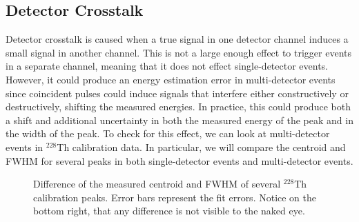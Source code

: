 \documentclass[notitlepage,rmp,aps,10pt]{revtex4-1}
\newcommand{\iso}[2]{$^{#1}$#2}
\newcommand{\Th}[1]{\iso{#1}{Th}}
\begin{document}
\subsection{Detector Crosstalk} \label{sec:crosstalk}
Detector crosstalk is caused when a true signal in one detector channel induces a small signal in another channel.
This is not a large enough effect to trigger events in a separate channel, meaning that it does not effect single-detector events.
However, it could produce an energy estimation error in multi-detector events since coincident pulses could induce signals that interfere either constructively or destructively, shifting the measured energies.
In practice, this could produce both a shift and additional uncertainty in both the measured energy of the peak and in the width of the peak.
To check for this effect, we can look at multi-detector events in \Th{228} calibration data.
In particular, we will compare the centroid and FWHM for several peaks in both single-detector events and multi-detector events.
\begin{figure}[h]
  \centering
  \caption[Peak shape comparison for single- and multi-detector events]{\label{fig:xtalk}
    Difference of the measured centroid and FWHM of several \Th{228} calibration peaks. Error bars represent the fit errors. Notice on the bottom right, that any difference is not visible to the naked eye.
  }
\end{figure}
\end{document}
